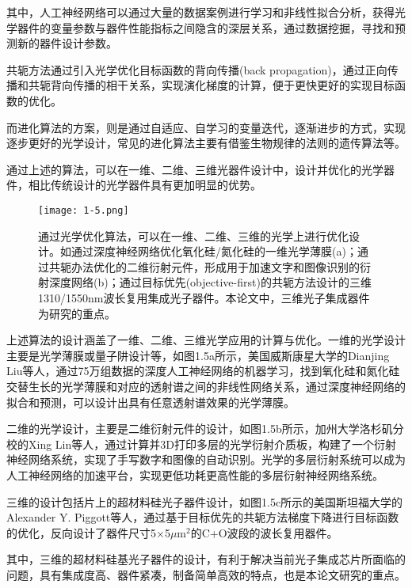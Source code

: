 其中，人工神经网络可以通过大量的数据案例进行学习和非线性拟合分析，获得光学器件的变量参数与器件性能指标之间隐含的深层关系，通过数据挖掘，寻找和预测新的器件设计参数。\cite{Liu2017Training}

共轭方法通过引入光学优化目标函数的背向传播(back propagation)，通过正向传播和共轭背向传播的相干关系，实现演化梯度的计算，便于更快更好的实现目标函数的优化。\cite{Vu2013Nanophotonic,Lu2013Objective,Molesky2018Outlook}

而进化算法的方案，则是通过自适应、自学习的变量迭代，逐渐进步的方式，实现逐步更好的光学设计，常见的进化算法主要有借鉴生物规律的法则的遗传算法等。

通过上述的算法，可以在一维、二维、三维光器件设计中，设计并优化的光学器件，相比传统设计的光学器件具有更加明显的优势。


\begin{figure}[!htbp]
    \centering
    \texttt{[image: 1-5.png]}
    \caption{通过光学优化算法，可以在一维、二维、三维的光学上进行优化设计。如通过深度神经网络优化氧化硅/氮化硅的一维光学薄膜(a)；通过共轭办法优化的二维衍射元件，形成用于加速文字和图像识别的衍射深度网络(b)；通过目标优先(objective-first)的共轭方法设计的三维1310/1550nm波长复用集成光子器件。本论文中，三维光子集成器件为研究的重点。\cite{Liu2017Training,Xing2018All,Piggott2015Inverse}}
    \label{fig:1-5}
\end{figure}

上述算法的设计涵盖了一维、二维、三维光学应用的计算与优化。一维的光学设计主要是光学薄膜或量子阱设计等，如图1.5a所示，美国威斯康星大学的Dianjing Liu等人，通过75万组数据的深度人工神经网络的机器学习，找到氧化硅和氮化硅交替生长的光学薄膜和对应的透射谱之间的非线性网络关系，通过深度神经网络的拟合和预测，可以设计出具有任意透射谱效果的光学薄膜。\cite{Liu2017Training}

二维的光学设计，主要是二维衍射元件的设计，如图1.5b所示，加州大学洛杉矶分校的Xing Lin等人，通过计算并3D打印多层的光学衍射介质板，构建了一个衍射神经网络系统，实现了手写数字和图像的自动识别。光学的多层衍射系统可以成为人工神经网络的加速平台，实现更低功耗更高性能的多层衍射神经网络系统。\cite{Xing2018All}

三维的设计包括片上的超材料硅光子器件设计，如图1.5c所示的美国斯坦福大学的Alexander Y. Piggott等人，通过基于目标优先的共轭方法梯度下降进行目标函数的优化，反向设计了器件尺寸5×5$\mu$m$^2$的C+O波段的波长复用器件。\cite{Piggott2015Inverse}

其中，三维的超材料硅基光子器件的设计，有利于解决当前光子集成芯片所面临的问题，具有集成度高、器件紧凑，制备简单高效的特点，也是本论文研究的重点。\cite{Staude2017Metamaterial,Yang2015On}

